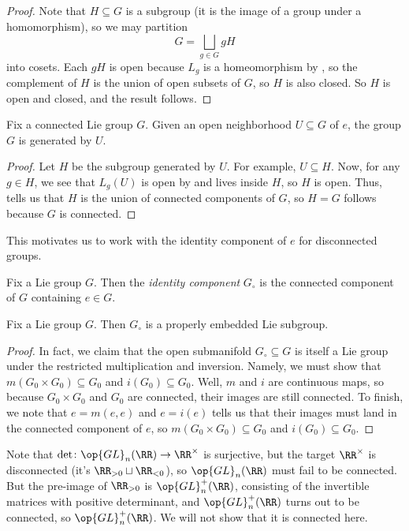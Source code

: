 \documentclass[../notes.tex]{subfiles}
\begin{document}
\begin{proof}
	Note that $H\subseteq G$ is a subgroup (it is the image of a group under a homomorphism), so we may partition
	\[G=\bigsqcup_{g\in G}gH\]
	into cosets. Each $gH$ is open because $L_g$ is a homeomorphism by , so the complement of $H$ is the union of open subsets of $G$, so $H$ is also closed. So $H$ is open and closed, and the result follows.
\end{proof}
\begin{proposition}
	Fix a connected Lie group $G$. Given an open neighborhood $U\subseteq G$ of $e$, the group $G$ is generated by $U$.
\end{proposition}
\begin{proof}
	Let $H$ be the subgroup generated by $U$. For example, $U\subseteq H$. Now, for any $g\in H$, we see that $L_g(U)$ is open by  and lives inside $H$, so $H$ is open. Thus,  tells us that $H$ is the union of connected components of $G$, so $H=G$ follows because $G$ is connected.
\end{proof}
This motivates us to work with the identity component of $e$ for disconnected groups.
\begin{definition}
	Fix a Lie group $G$. Then the \textit{identity component} $G_\circ$ is the connected component of $G$ containing $e\in G$.
\end{definition}
\begin{proposition}
	Fix a Lie group $G$. Then $G_\circ$ is a properly embedded Lie subgroup.
\end{proposition}
\begin{proof}
	In fact, we claim that the open submanifold $G_\circ\subseteq G$ is itself a Lie group under the restricted multiplication and inversion. Namely, we must show that $m(G_0\times G_0)\subseteq G_0$ and $i(G_0)\subseteq G_0$. Well, $m$ and $i$ are continuous maps, so because $G_0\times G_0$ and $G_0$ are connected, their images are still connected. To finish, we note that $e=m(e,e)$ and $e=i(e)$ tells us that their images must land in the connected component of $e$, so $m(G_0\times G_0)\subseteq G_0$ and $i(G_0)\subseteq G_0$.
\end{proof}
\begin{example}
	Note that $\det\colon\op{GL}_n(\RR)\to\RR^\times$ is surjective, but the target $\RR^\times$ is disconnected (it's $\RR_{>0}\sqcup\RR_{<0}$), so $\op{GL}_n(\RR)$ must fail to be connected. But the pre-image of $\RR_{>0}$ is $\op{GL}^+_n(\RR)$, consisting of the invertible matrices with positive determinant, and $\op{GL}^+_n(\RR)$ turns out to be connected, so $\op{GL}^+_n(\RR)$. We will not show that it is connected here.
\end{example}
\end{document}
